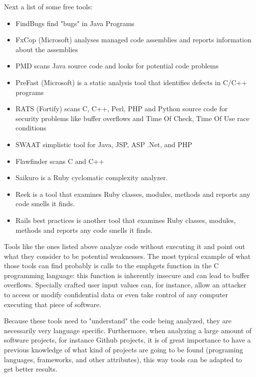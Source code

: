 Next a list of some free tools:
\begin{itemize}
\item\textsf{FindBugs} find "bugs" in Java Programs
\item\textsf{FxCop (Microsoft)} analyses managed code assemblies and reports information about the assemblies
\item\textsf{PMD} scans Java source code and looks for potential code problems
\item\textsf{PreFast} (Microsoft) is a static analysis tool that identifies defects in C/C++ programs
\item\textsf{RATS} (Fortify) scans C, C++, Perl, PHP and Python source code for security problems like buffer overflows and Time Of Check, Time Of Use race conditions
\item\textsf{SWAAT} simplistic tool for Java, JSP, ASP .Net, and PHP
\item\textsf{Flawfinder} scans C and C++
\item\textsf{Saikuro} is a Ruby cyclomatic complexity analyzer.
\item\textsf{Reek} is a tool that examines Ruby classes, modules, methods and reports any code smells it finds.
\item\textsf{Rails best practices} is another tool that examines Ruby classes, modules, methods and reports any code smells it finds.




\end{itemize}

Tools like the ones listed above analyze code without executing it and point out what they consider to be potential weaknesses.
The most typical example of what those tools can find probably is calls to the emph{gets} function in
the C programming language: this function is inherently insecure and can lead to buffer
overflows. Specially crafted user input values can, for instance, allow an attacker to access
or modify confidential data or even take control of any computer executing that piece of
software.

Because these tools need to "understand" the code being analyzed, they are necessarily very language specific.
Furthermore, when analyzing a large amount of software projects, for instance Github projects,
it is of great importance to have a previous knowledge of what kind of projects  are going to be found (programing languages, frameworks, and other attributes),
this way tools can be adapted to get better results. 

